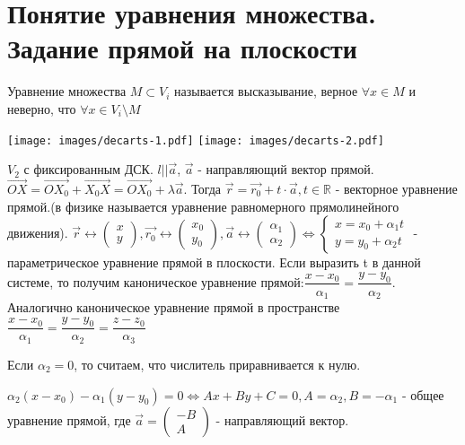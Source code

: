 \section{Понятие уравнения множества. Задание прямой на плоскости}
\begin{definition}
	Уравнение множества \(M\subset V_i\) называется высказывание, верное $\forall x\in M$ и неверно, что $\forall x\in V_i \setminus M$ 
\end{definition}

\vspace{.7cm}
\hfill \texttt{[image: images/decarts-1.pdf]} \hfill	\texttt{[image: images/decarts-2.pdf]} \hfill 
\vspace{.7cm}

\(V_2\) с фиксированным ДСК. \(l || \vec a\), \(\vec a\) - направляющий вектор прямой. \(\vec{OX} = \vec{OX_0}+\vec{X_0X} = \vec{OX_0} + \lambda \vec{a}\). Тогда \(\vec{r} = \vec{r_0} + t\cdot\vec{a}, t\in \mathbb{R}\) - векторное уравнение прямой.(в физике называется уравнение равномерного прямолинейного движения).
\(\vec r \longleftrightarrow \begin{pmatrix}
	x \\ y
\end{pmatrix}, 
\vec{r_0}\longleftrightarrow \begin{pmatrix}
	x_0 \\ y_0
\end{pmatrix},
\vec a\longleftrightarrow \begin{pmatrix}
	\alpha_1 \\ \alpha_2
\end{pmatrix} \Longleftrightarrow \left\{\begin{gathered}
	x = x_0 + \alpha_1t \\
	y = y_0 + \alpha_2t
\end{gathered}\right.
\) - параметрическое уравнение прямой в плоскости. \newline
Если выразить t в данной системе, то получим каноническое уравнение прямой:\newline \(\dfrac{x - x_0}{\alpha_1} = \dfrac{y - y_0}{\alpha_2}\). Аналогично каноническое уравнение прямой в пространстве\newline\(\dfrac{x - x_0}{\alpha_1} = \dfrac{y - y_0}{\alpha_2} = \dfrac{z - z_0}{\alpha_3}\)
\begin{note}
	Если $\alpha_2 = 0$, то считаем, что числитель приравнивается к нулю.
\end{note}
$\alpha_2(x - x_0) - \alpha_1(y - y_0) = 0 \Longleftrightarrow Ax+By+C = 0, A = \alpha_2, B = - \alpha_1$ - общее уравнение прямой, где \(\vec a = \begin{pmatrix}
	-B \\ A
\end{pmatrix}\) - направляющий вектор.
